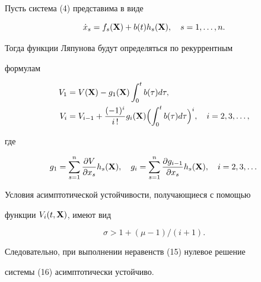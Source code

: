 \begin{exam} Пусть система (4) представима в виде 


\begin{equation} 


\Dot x_s=f_s(\bx)+b(t)h_s(\bx),\quad s=1,\dotsc,n. 


\end{equation} 


Тогда функции Ляпунова будут определяться по рекуррентным 


формулам 


\begin{align*} 


V_1&=V(\bx)-g_1(\bx)\int^t_0 b(\tau)d\tau,\\ 


V_i&=V_{i-1}+\frac{(-1)^i}{i\,!}g_i(\bx)\Bigl( 


\int^t_0 b(\tau)d\tau\Bigr)^i,\quad i=2,3,\dotsc, 


\end{align*} 


где 


$$


g_1=\sum^n_{s=1}\frac{\partial V}{\partial x_s}h_s(\bx),\quad


g_i=\sum^n_{s=1}\frac{\partial g_{i-1}}{\partial x_s} 


h_s(\bx),\quad i=2,3,\dotsc


$$


Условия асимптотической устойчивости, получающиеся с помощью 


функции $V_i(t,\bold X)$, имеют вид 


$$ 


\sigma>1+(\mu-1)/(i+1). 


$$ 


Следовательно, при выполнении неравенств (15) нулевое решение 


системы (16) асимптотически устойчиво. 


\end{exam} 


 


